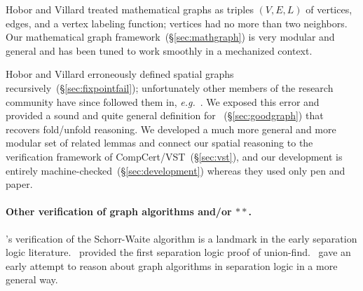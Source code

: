 \iffalse
Our development is entirely machine-checked~(\S\ref{sec:development}) which revealed some
tricky technique details. Hobor and Villard fell into the trap of defining spatial graphs
recursively~(\S\ref{sec:fixpointfail}); unfortunately other members of the research
community have since followed them in.  We exposed this error and provided a sound,
general, and highly modular graph framework that works smoothly in a mechanized
context~(\S\ref{sec:mathgraph},\S\ref{sec:spacegraph}).
\fi
\iftrue
Hobor and Villard treated mathematical graphs as triples $(V,E,L)$ of
vertices, edges, and a vertex labeling function; vertices had no more than two
neighbors.  Our mathematical graph framework~(\S\ref{sec:mathgraph}) is very
modular and general and has been tuned to work smoothly in a mechanized context.

Hobor and Villard erroneously defined spatial graphs
recursively~(\S\ref{sec:fixpointfail}); unfortunately other members of the research
community have since followed them in, \emph{e.g.}~\cite{raadvg15}.  We exposed this
error and provided a sound and quite general definition for
~(\S\ref{sec:goodgraph}) that recovers fold/unfold reasoning.  We developed a
much more general and more modular set of related lemmas and connect our spatial
reasoning to the verification framework of CompCert/VST~(\S\ref{sec:vst}), and 
our development is entirely
machine-checked~(\S\ref{sec:development}) whereas they used only pen and paper.
\fi

\paragraph{Other verification of graph algorithms and/or $**$.}
\cite{hongseok:phd}'s verification of the Schorr-Waite algorithm is a landmark in the 
early separation logic literature.  \cite{neelthesis}~provided the first separation
logic proof of union-find.  \cite{bornat:aliasing04}~gave an early attempt to
reason about graph algorithms in separation logic in a more general
way.

